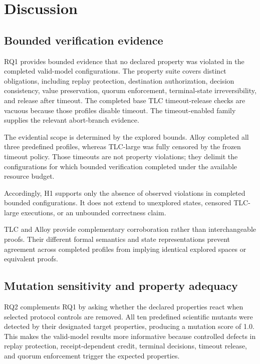 \section{Discussion}
\label{sec:discussion}

\subsection{Bounded verification evidence}
\label{subsec:discussion-bounded-verification}

RQ1 provides bounded evidence that no declared property was violated in the
completed valid-model configurations. The property suite covers distinct
obligations, including replay protection, destination authorization, decision
consistency, value preservation, quorum enforcement, terminal-state
irreversibility, and release after timeout. The completed base TLC
timeout-release checks are vacuous because those profiles disable timeout.
The timeout-enabled family supplies the relevant abort-branch evidence.

The evidential scope is determined by the explored bounds. Alloy completed all
three predefined profiles, whereas TLC-large was fully censored by the frozen
timeout policy. Those timeouts are not property violations; they delimit the
configurations for which bounded verification completed under the available
resource budget.

Accordingly, H1 supports only the absence of observed violations in completed
bounded configurations. It does not extend to unexplored states, censored
TLC-large executions, or an unbounded correctness claim.

TLC and Alloy provide complementary corroboration rather than interchangeable
proofs. Their different formal semantics and state representations prevent
agreement across completed profiles from implying identical explored spaces or
equivalent proofs.

\subsection{Mutation sensitivity and property adequacy}
\label{subsec:discussion-mutation}

RQ2 complements RQ1 by asking whether the declared properties react when
selected protocol controls are removed. All ten predefined scientific mutants
were detected by their designated target properties, producing a mutation score
of 1.0. This makes the valid-model results more informative because controlled
defects in replay protection, receipt-dependent credit, terminal decisions,
timeout release, and quorum enforcement trigger the expected properties.

